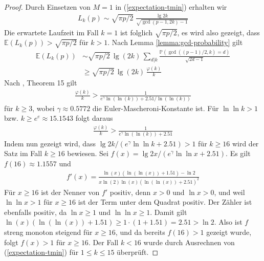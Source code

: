 \documentclass[a4paper, 10pt, ngerman]{article}
\newcommand{\E}{\mathbb{E}}
\renewcommand{\P}{\mathbb{P}}
\begin{document}
\begin{proof}
    Durch Einsetzen von $M = 1$ in (\ref{expectation-tmin}) erhalten wir
    \begin{align*}
        L_k(p) \sim \sqrt {\pi p / 2} \;
        \frac {\lg 2k} {\sqrt{\gcd(p - 1, 2k) - 1}}
    \end{align*}
    Die erwartete Laufzeit im Fall $k = 1$ ist folglich $\sqrt{\pi p/2}$, es wird also gezeigt, dass $\E(L_k(p)) > \sqrt{\pi p / 2}$ für $k > 1$. Nach Lemma \ref{lemma:gcd-probability} gilt
    \begin{align*}
        \E(L_k(p))
         & \sim \sqrt{\pi p / 2} \, \lg (2k) \,
        \sum_{d | k} \frac {\P(\gcd((p - 1)/2, k) = d)}
        { \sqrt {2d - 1}} \nonumber                                 \\
         & \ge \sqrt{\pi p / 2} \, \lg (2k) \, \frac {\varphi(k)} k
    \end{align*}
    Nach \cite{rs62}, Theorem 15 gilt
    \begin{align*}
        \frac {\varphi(k)} k
        > \frac 1 {e^\gamma \ln (\ln (k)) + 2.51 / \ln (\ln (k))}
    \end{align*}
    für $k \ge 3$, wobei $\gamma \approx 0.5772$ die Euler-Mascheroni-Konstante ist. Für $\ln \ln k > 1$ bzw. $k \ge e^e \approx 15.1543$ folgt daraus
    \begin{align*}
        \frac {\varphi(k)} k > \frac 1 {e^\gamma \ln (\ln (k)) + 2.51}
    \end{align*}
    Indem nun gezeigt wird, dass $\lg 2k / (e^\gamma \ln \ln k + 2.51) > 1$ für $k \ge 16$ wird der Satz im Fall $k \ge 16$ bewiesen. Sei $f(x) = \lg 2x / (e^\gamma \ln \ln x + 2.51)$. Es gilt $f(16) \approx 1.1557$ und
    \begin{align*}
        f'(x)
        = \frac {\ln (x)(\ln (\ln (x)) + 1.51) - \ln 2}
        {x \ln (2) \ln (x)(\ln(\ln(x)) + 2.51)^2}
    \end{align*}
    Für $x \ge 16$ ist der Nenner von $f'$ positiv, denn $x > 0$ und $\ln x > 0$, und weil $\ln \ln x > 1$ für $x \ge 16$ ist der Term unter dem Quadrat positiv. Der Zähler ist ebenfalls positiv, da $\ln x \ge 1$ und $\ln \ln x \ge 1$. Damit gilt $\ln(x)(\ln(\ln(x)) + 1.51) \ge 1 \cdot (1 + 1.51) = 2.51 > \ln 2$. Also ist $f$ streng monoton steigend für $x \ge 16$, und da bereits $f(16) > 1$ gezeigt wurde, folgt $f(x) > 1$ für $x \ge 16$. Der Fall $k < 16$ wurde durch Ausrechnen von (\ref{expectation-tmin}) für $1 \le k \le 15$ überprüft.
\end{proof}
\end{document}
